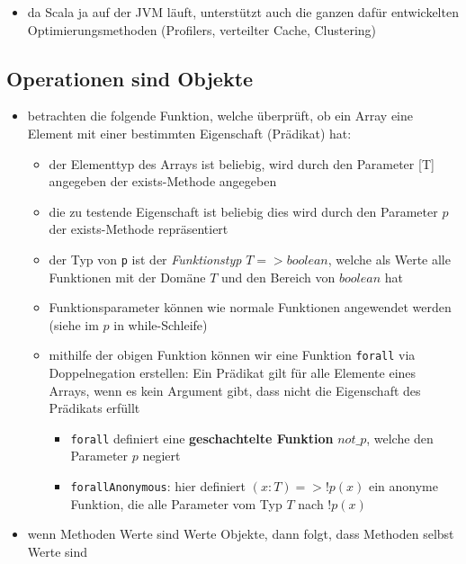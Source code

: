 

\begin{itemize}
  \item da Scala ja auf der JVM läuft, unterstützt auch die ganzen dafür
  entwickelten Optimierungsmethoden (Profilers, verteilter Cache, Clustering)
\end{itemize}


\subsection{Operationen sind Objekte}


\begin{itemize}
  \item betrachten die folgende Funktion, welche überprüft, ob ein Array eine
  Element mit einer bestimmten Eigenschaft (Prädikat) hat:
  
  
  
  \begin{itemize}
    \item der Elementtyp des Arrays ist beliebig, wird durch den Parameter [T]
    angegeben der exists-Methode angegeben 
    \item die zu testende Eigenschaft ist beliebig \und dies wird durch
    den Parameter $p$ der exists-Methode repräsentiert
    \item der Typ von \texttt{p} ist der \textit{Funktionstyp} $T => boolean$,
    welche als Werte alle Funktionen mit der Domäne $T$ und den Bereich von
    $boolean$ hat
    \item Funktionsparameter können wie normale Funktionen angewendet werden 
    (siehe im $p$ in while-Schleife)
    \item mithilfe der obigen Funktion können wir eine Funktion \texttt{forall}
  via Doppelnegation erstellen: Ein Prädikat gilt für alle Elemente eines Arrays,
  wenn es kein Argument gibt, dass nicht die Eigenschaft des Prädikats erfüllt
    \begin{itemize}
      \item \texttt{forall} definiert eine \textbf{geschachtelte Funktion} 
      $not\_p$, welche den Parameter $p$ negiert
      \item \texttt{forallAnonymous}: hier definiert $(x: T) => !p(x)$
      ein anonyme Funktion, die alle Parameter vom Typ $T$ nach $!p(x)$
    \end{itemize}
  \end{itemize}
  \item wenn Methoden Werte sind \und Werte Objekte, dann folgt, dass Methoden
  selbst Werte sind
\end{itemize}


